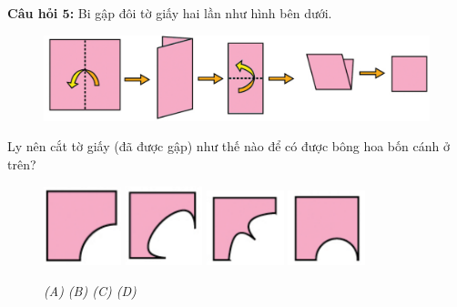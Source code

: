 \textbf{\color{toancuabi}Câu hỏi $\pmb{5}$:} Bi gập đôi tờ giấy hai lần như hình bên dưới.
\begin{figure}[H]
	\vspace*{-5pt}
	\captionsetup{labelformat=empty}
	\centering
	\captionsetup{justification=raggedleft}
	\includegraphics[width =1\textwidth]{cat-12}
	\vspace*{-10pt}
\end{figure}
Ly nên cắt tờ giấy (đã được gập) như thế nào để có được bông hoa bốn cánh ở trên?
\begin{figure}[H]
	\centering
	\captionsetup{labelformat=empty}
	\vspace*{-5pt}
	\captionsetup{justification=centering}
	\includegraphics[width =0.2\textwidth]{cat-13a}
	\hfill
	\includegraphics[width =0.2\textwidth]{cat-13b}
	\hfill
	\includegraphics[width =0.2\textwidth]{cat-13c}
	\hfill
	\includegraphics[width =0.2\textwidth]{cat-13d}	
	\vspace*{-5pt}
	\caption{\small \it (A)\hspace*{40pt} (B)\hspace*{65pt} (C) \hspace*{40pt} (D)}
	\vspace*{-10pt}
\end{figure}
